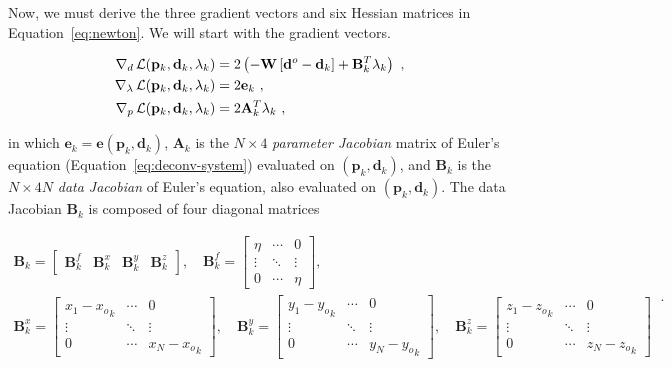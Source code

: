 Now, we must derive the three gradient vectors and six Hessian matrices in
Equation~\ref{eq:newton}.
We will start with the gradient vectors.

\begin{equation}
  \begin{aligned}
    \mathbf{\nabla}_d\operatorname{\mathcal{L}}(\mathbf{p}_k,\mathbf{d}_k,\mathbf{\lambda}_k) &=
      2\left(-\mathbf{W}\left[\mathbf{d}^o - \mathbf{d}_k\right]
      + \mathbf{B}_k^T\mathbf{\lambda}_k\right)
    \ ,
    \\
    \mathbf{\nabla}_\lambda\operatorname{\mathcal{L}}(\mathbf{p}_k,\mathbf{d}_k,\mathbf{\lambda}_k) &=
      2\mathbf{e}_k
    \ ,
    \\
    \mathbf{\nabla}_p\operatorname{\mathcal{L}}(\mathbf{p}_k,\mathbf{d}_k,\mathbf{\lambda}_k) &=
      2\mathbf{A}_k^T\mathbf{\lambda}_k
    \ ,
  \end{aligned}
  \label{eq:grad}
\end{equation}

\noindent
in which $\mathbf{e}_k = \mathbf{e}(\mathbf{p}_k,\mathbf{d}_k)$, $\mathbf{A}_k$
is the $N \times 4$ \textit{parameter Jacobian} matrix of Euler's equation
(Equation~\ref{eq:deconv-system}) evaluated on $(\mathbf{p}_k,\mathbf{d}_k)$,
and $\mathbf{B}_k$ is the $N \times 4N$ \textit{data Jacobian} of Euler's
equation, also evaluated on $(\mathbf{p}_k,\mathbf{d}_k)$. The data Jacobian
$\mathbf{B}_k$ is composed of four diagonal matrices

\begin{equation}
  \begin{gathered}
  \mathbf{B}_k =
  \begin{bmatrix}
    \mathbf{B}^f_k &
    \mathbf{B}^x_k &
    \mathbf{B}^y_k &
    \mathbf{B}^z_k
  \end{bmatrix}
  , \quad
  \mathbf{B}^f_k =
  \begin{bmatrix}
    \eta & \cdots & 0 \\
    \vdots & \ddots & \vdots \\
    0 & \cdots & \eta
  \end{bmatrix}
  ,
  \\
  \mathbf{B}^x_k =
  \begin{bmatrix}
    x_1 - {x_o}_k & \cdots & 0 \\
    \vdots & \ddots & \vdots \\
    0 & \cdots & x_N - {x_o}_k
  \end{bmatrix}
  , \quad
  \mathbf{B}^y_k =
  \begin{bmatrix}
    y_1 - {y_o}_k & \cdots & 0 \\
    \vdots & \ddots & \vdots \\
    0 & \cdots & y_N - {y_o}_k
  \end{bmatrix}
  , \quad
  \mathbf{B}^z_k =
  \begin{bmatrix}
    z_1 - {z_o}_k & \cdots & 0 \\
    \vdots & \ddots & \vdots \\
    0 & \cdots & z_N - {z_o}_k
  \end{bmatrix}
  \end{gathered}
  \ .
  \label{eq:B}
\end{equation}

